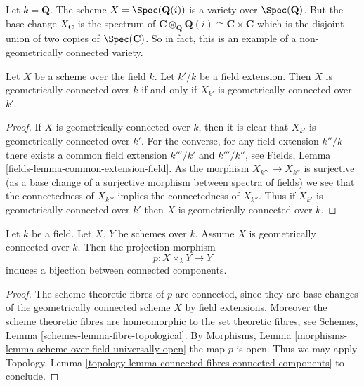 \begin{example}
\label{example-not-geometrically-irreducible}
Let $k = \mathbf{Q}$. The scheme
$X = \Spec(\mathbf{Q}(i))$ is a variety over $\Spec(\mathbf{Q})$.
But the base change $X_{\mathbf{C}}$ is the spectrum of
$\mathbf{C} \otimes_{\mathbf{Q}} \mathbf{Q}(i) \cong
\mathbf{C} \times \mathbf{C}$ which is the disjoint union of
two copies of $\Spec(\mathbf{C})$. So in fact, this is an
example of a non-geometrically connected variety.
\end{example}

\begin{lemma}
\label{lemma-geometrically-connected-check-after-extension}
Let $X$ be a scheme over the field $k$.
Let $k'/k$ be a field extension.
Then $X$ is geometrically connected over $k$ if and only if
$X_{k'}$ is geometrically connected over $k'$.
\end{lemma}

\begin{proof}
If $X$ is geometrically connected over $k$, then it is clear that
$X_{k'}$ is geometrically connected over $k'$. For the converse,
for any field extension $k''/k$ there exists a common
field extension $k'''/k'$ and $k'''/k''$, see
Fields, Lemma \ref{fields-lemma-common-extension-field}. As the
morphism $X_{k'''} \to X_{k''}$ is surjective (as a base change of
a surjective morphism between spectra of fields) we see that the
connectedness of $X_{k'''}$ implies the connectedness of $X_{k''}$.
Thus if $X_{k'}$ is geometrically connected over $k'$ then
$X$ is geometrically connected over $k$.
\end{proof}

\begin{lemma}
\label{lemma-bijection-connected-components}
Let $k$ be a field.
Let $X$, $Y$ be schemes over $k$.
Assume $X$ is geometrically connected over $k$.
Then the projection morphism
$$
p : X \times_k Y \longrightarrow Y
$$
induces a bijection between connected components.
\end{lemma}

\begin{proof}
The scheme theoretic fibres of $p$ are connected, since they
are base changes of the geometrically connected scheme $X$ by
field extensions. Moreover the scheme theoretic fibres are
homeomorphic to the set theoretic fibres, see
Schemes, Lemma \ref{schemes-lemma-fibre-topological}.
By
Morphisms, Lemma \ref{morphisms-lemma-scheme-over-field-universally-open}
the map $p$ is open.
Thus we may apply Topology,
Lemma \ref{topology-lemma-connected-fibres-connected-components}
to conclude.
\end{proof}

